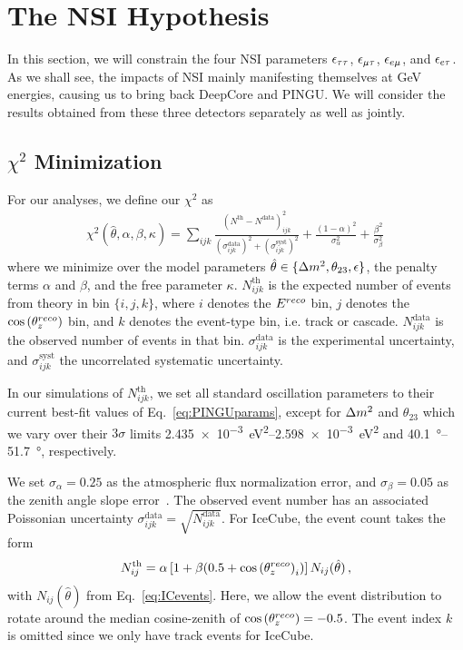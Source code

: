 \section{The NSI Hypothesis}\label{sec:constraining}
In this section, we will constrain the four NSI parameters $\epsilon_{\tau\tau}$, $\epsilon_{\mu\tau}$, $\epsilon_{e\mu}$, and $\epsilon_{e\tau}$. As we shall see, the impacts of NSI mainly manifesting 
themselves at \si{\GeV} energies, causing us to bring back DeepCore and PINGU. We will consider the results obtained from these three detectors separately as well as jointly.

\subsection{$\chi^2$ Minimization}\label{sec:nsi_chi2}
For our analyses, we define our $\chi^2$ as
\begin{align}\label{eq:chisq_NSI}
    \chi^{2}(\hat{\theta},\alpha,\beta, \kappa)=\sum_{ijk} \frac{\left(N^\text{th}-N^\text{data}\right)_{ijk}^{2}}
    {\left(\sigma^\text{data}_{ijk}\right)^{2} + \left(\sigma^\text{syst}_{ijk}\right)^{2}}+ 
    \frac{(1-\alpha)^2}{\sigma_\alpha^2} + \frac{\beta^2}{\sigma_\beta^2}\,
\end{align}
where we minimize over the model parameters $\hat{\theta} \in \{\dm, \theta_{23}, \epsilon\}$, the penalty terms $\alpha$ and $\beta$, and the free parameter $\kappa$.
$N_{ijk}^\text{th}$ is the expected number of events from theory in bin $\{i,j,k\}$, where $i$ denotes the $E^{reco}$ bin, $j$ denotes the $\cos{(\theta_z^{reco})}$ bin,
and $k$ denotes the event-type bin, i.e. track or cascade. 
$N_{ijk}^\text{data}$ is the observed number of events in that bin. $\sigma^\text{data}_{ijk}$ is the experimental uncertainty, and $\sigma^\text{syst}_{ijk}$ the uncorrelated systematic
uncertainty.

In our simulations of $N_{ijk}^\text{th}$, we set all standard oscillation parameters to their current best-fit values of Eq.~\ref{eq:PINGUparams}, 
except for $\dm$ and $\theta_{23}$
which we vary over their $3\sigma$ limits \SIrange{2.435e-3}{2.598e-3}{\eV\squared} and \SIrange{40.1}{51.7}{\degree}, respectively.

We set $\sigma_\alpha = 0.25$ as the atmospheric flux normalization error, and $\sigma_\beta = 0.05$ as the zenith angle slope error~\cite{hondapaper}. 
The observed event number has an associated Poissonian uncertainty $\sigma_{ijk}^\text{data} = \sqrt{N_{ijk}^\text{data}}$.
For IceCube, the event count takes the form
\begin{align}
    N^\text{th}_{ij} = \alpha\left[1+\beta (0.5 + \cos{(\theta_z^{reco})}_i )\right] N_{ij}(\hat{\theta})\,,
\end{align}
with $N_{ij}(\hat{\theta})$ from Eq.~\ref{eq:ICevents}. Here, we allow the event distribution to rotate around the median cosine-zenith of $\cos{(\theta_z^{reco})} = -0.5$. 
The event index $k$ is omitted since we only have track events for IceCube.

